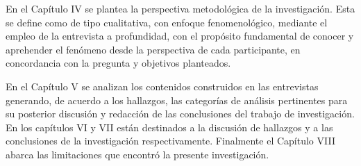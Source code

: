 En el Capítulo IV se plantea la perspectiva metodológica de la investigación.
Esta se define como de tipo cualitativa, con enfoque fenomenológico, mediante el
empleo de la entrevista a profundidad, con el propósito fundamental de conocer y
aprehender el fenómeno desde la perspectiva de cada participante, en
concordancia con la pregunta y objetivos planteados.

En el Capítulo V se analizan los contenidos construidos en las entrevistas
generando, de acuerdo a los hallazgos, las categorías de análisis pertinentes
para su posterior discusión y redacción de las conclusiones del trabajo de
investigación.
En los capítulos VI y VII están destinados a la discusión de hallazgos y a las
conclusiones de la investigación respectivamente.
Finalmente el Capítulo VIII abarca las limitaciones que encontró la presente
investigación.
